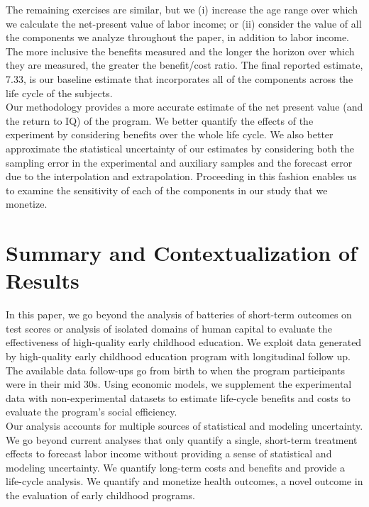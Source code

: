 \noindent The remaining exercises are similar, but we (i) increase the age range over which we calculate the net-present value of labor income; or (ii) consider the value of all the components we analyze throughout the paper, in addition to labor income. The more inclusive the benefits measured and the longer the horizon over which they are measured, the greater the benefit/cost ratio. The final reported estimate, 7.33, is our baseline estimate that incorporates all of the components across the life cycle of the subjects.\\

\noindent Our methodology provides a more accurate estimate of the net present value (and the return to IQ) of the program. We better quantify the effects of the experiment by considering benefits over the whole life cycle. We also better approximate the statistical uncertainty of our estimates by considering both the sampling error in the experimental and auxiliary samples and the forecast error due to the interpolation and extrapolation. Proceeding in this fashion enables us to examine the sensitivity of each of the components in our study that we monetize.

\section{Summary and Contextualization of Results} \label{section:conclusion}

In this paper, we go beyond the analysis of batteries of short-term outcomes on test scores or analysis of isolated domains of human capital to evaluate the effectiveness of high-quality early childhood education. We exploit data generated by high-quality early childhood education program with longitudinal follow up. The available data follow-ups go from birth to when the program participants were in their mid 30s. Using economic models, we supplement the experimental data with non-experimental datasets to estimate life-cycle benefits and costs to evaluate the program's social efficiency.\\

\noindent Our analysis accounts for multiple sources of statistical and modeling uncertainty. We go beyond current analyses that only quantify a single, short-term treatment effects to forecast labor income without providing a sense of statistical and modeling uncertainty. We quantify long-term costs and benefits and provide a life-cycle analysis. We quantify and monetize health outcomes, a novel outcome in the evaluation of early childhood programs.\\

